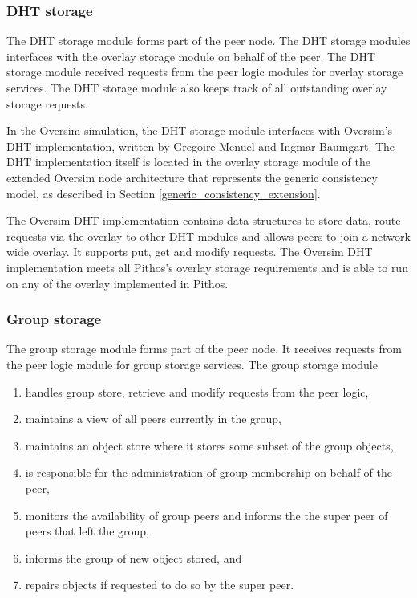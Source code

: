 \subsubsection{DHT storage}

The DHT storage module forms part of the peer node. The DHT storage modules interfaces with the overlay storage module on behalf of the peer. The DHT storage module received requests from the peer logic modules for overlay storage services. The DHT storage module also keeps track of all outstanding overlay storage requests.

In the Oversim simulation, the DHT storage module interfaces with Oversim's DHT implementation, written by Gregoire Menuel and Ingmar Baumgart. The DHT implementation itself is located in the overlay storage module of the extended Oversim node architecture that represents the generic consistency model, as described in Section \ref{generic_consistency_extension}.

The Oversim DHT implementation contains data structures to store data, route requests via the overlay to other DHT modules and allows peers to join a network wide overlay. It supports put, get and modify requests. The Oversim DHT implementation meets all Pithos's overlay storage requirements and is able to run on any of the overlay implemented in Pithos.

\subsubsection{Group storage}

The group storage module forms part of the peer node. It receives requests from the peer logic module for group storage services. The group storage module
\begin{enumerate}
  \item handles group store, retrieve and modify requests from the peer logic,
  \item maintains a view of all peers currently in the group,
  \item maintains an object store where it stores some subset of the group objects,
  \item is responsible for the administration of group membership on behalf of the peer,
  \item monitors the availability of group peers and informs the the super peer of peers that left the group,
  \item informs the group of new object stored, and
  \item repairs objects if requested to do so by the super peer.
\end{enumerate}

